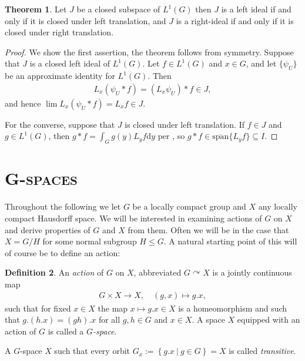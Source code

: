\documentclass[10pt,twoside,openany,final]{memoir}
\newcommand{\sssection}[1]{%
\section[#1]{\centering\normalfont\scshape \textbf{#1}}}
\theoremstyle{definition}
\newtheorem{theorem}{Theorem}[chapter]
\newtheorem{definition}[theorem]{Definition}
\theoremstyle{Break}
\renewcommand{\d}{\mathrm{d}}
\def\acts{\curvearrowright}
\begin{document}
\begin{theorem}
	Let $J$ be a closed subspace of $L^1(G)$ then $J$ is a left ideal if and only if it is closed under left translation, and $J$ is a right-ideal if and only if it is closed under right translation.	
	\label{2.43}
\end{theorem}
\begin{proof}
We show the first assertion, the theorem follows from symmetry. Suppose that $J$ is a closed left ideal of $L^1(G)$. Let $f \in L^1(G)$ and $x \in G$, and let $\{\psi_U\}$ be an approximate identity for $L^1(G)$. Then
\begin{align*}
	L_x(\psi_U \ast f) = (L_x \psi_U) \ast f \in J,
\end{align*}
and hence $\lim L_x (\psi_U \ast f) = L_x f \in J$. 

For the converse, suppose that $J$ is closed under left translation. If $f \in J$ and $g \in L^1(G)$, then $g \ast f = \int_{G} g(y) L_y f \d y$ per , so $g \ast f \in \overline{\mathrm{span}}\{L_y f\}\subseteq I$.
\end{proof}
\sssection{G-spaces}
Throughout the following we let $G$ be a locally compact group and $X$ any locally compact Hausdorff space. We will be interested in examining actions of $G$ on $X$ and derive properties of $G$ and $X$ from them. Often we will be in the case that $X=G/H$ for some normal subgroup $H \leq G$. A natural starting point of this will of course be to define an action:
\begin{definition}
	An \emph{action} of $G$ on $X$, abbreviated $G \acts X$ is a jointly continuous map
	\begin{align*}
		G \times X \to X,\quad (g,x) \mapsto g.x,
	\end{align*}
	such that for fixed $x \in X$ the map $x \mapsto g.x\in X$ is a homeomorphism and such that $g.(h.x)=(gh).x$ for all $g,h \in G$ and $x \in X$. A space $X$ equipped with an action of $G$ is called a \emph{$G$-space}.

	A $G$-space $X$ such that every orbit $G_x:=\left\{ g.x \ | \ g \in G \right\}=X$ is called \emph{transitive}. 
\end{definition}
\end{document}

